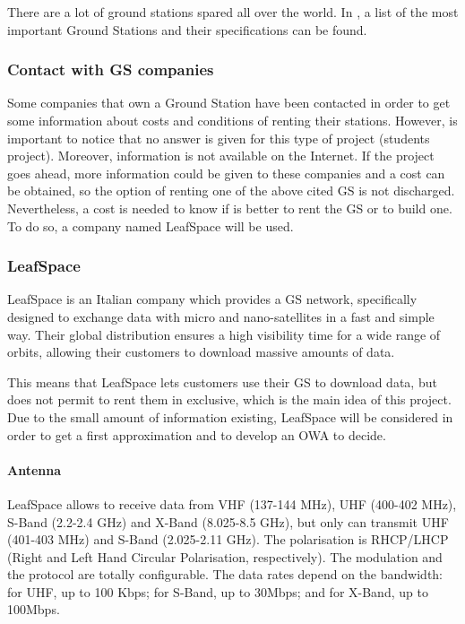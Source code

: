 There are a lot of ground stations spared all over the world. In \cite[Chapter 3, Section 4]{annex3}, a list of the most important Ground Stations and their specifications can be found.

\subsubsection{Contact with GS companies}
Some companies that own a Ground Station have been contacted in order to get some information about costs and conditions of renting their stations. However, is important to notice that no answer is given for this type of project (students project). Moreover, information is not available on the Internet. If the project goes ahead, more information could be given to these companies and a cost can be obtained, so the option of renting one of the above cited GS is not discharged. Nevertheless, a cost is needed to know if is better to rent the GS or to build one. To do so, a company named LeafSpace will be used.

\subsubsection{LeafSpace}
LeafSpace is an Italian company which provides a GS network, specifically designed to exchange data with micro and nano-satellites in a fast and simple way. Their global distribution ensures a high visibility time for a wide range of orbits, allowing their customers to download massive amounts of data.

This means that LeafSpace lets customers use their GS to download data, but does not permit to rent them in exclusive, which is the main idea of this project. Due to the small amount of information existing, LeafSpace will be considered in order to get a first approximation and to develop an OWA to decide. 

\paragraph{Antenna}
LeafSpace allows to receive data from VHF (137-144 MHz), UHF (400-402 MHz), S-Band (2.2-2.4 GHz) and X-Band (8.025-8.5 GHz), but only can transmit UHF (401-403 MHz) and S-Band (2.025-2.11 GHz). The polarisation is RHCP/LHCP (Right and Left Hand Circular Polarisation, respectively). The modulation and the protocol are totally configurable. The data rates depend on the bandwidth: for UHF, up to 100 Kbps; for S-Band, up to 30Mbps; and for X-Band, up to 100Mbps. 

